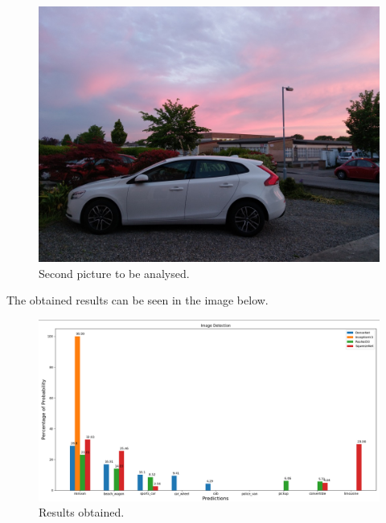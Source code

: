     \begin{figure}[htb]
        \centering
        \includegraphics[scale = 0.2]{Sections/4InitialWork/4_images/run3_pic.jpg}
        \caption{Second picture to be analysed.} 
    \end{figure}
    \par The  obtained results can be seen in the image below.
    \begin{figure}[htb]
        \centering
        \includegraphics[scale = 0.37]{Sections/4InitialWork/4_images/run3_res.png}
        \caption{Results obtained.} 
    \end{figure}

    \newpage
